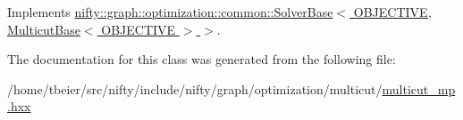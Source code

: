 Implements \hyperlink{classnifty_1_1graph_1_1optimization_1_1common_1_1SolverBase_a1c08eb1ff2b3cca5366c3aab161ba040}{nifty\+::graph\+::optimization\+::common\+::\+Solver\+Base$<$ O\+B\+J\+E\+C\+T\+I\+V\+E, Multicut\+Base$<$ O\+B\+J\+E\+C\+T\+I\+V\+E $>$ $>$}.



The documentation for this class was generated from the following file\+:\begin{DoxyCompactItemize}
\item 
/home/tbeier/src/nifty/include/nifty/graph/optimization/multicut/\hyperlink{multicut__mp_8hxx}{multicut\+\_\+mp.\+hxx}\end{DoxyCompactItemize}
